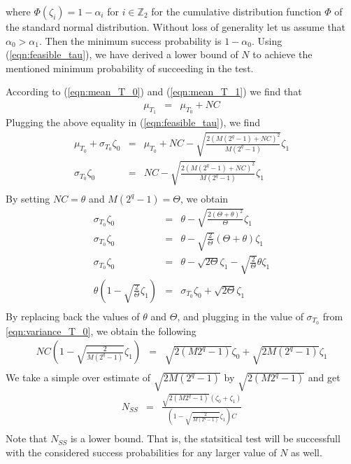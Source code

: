 where $\mathit{\Phi}(\zeta_i) = 1 - \alpha_i$ for $i \in \mathbb{Z}_2$ for the cumulative distribution function $\mathit{\Phi}$ of the standard normal distribution. Without loss of generality let us assume that $\alpha_0 > \alpha_1$. Then the minimum success probability is $1-\alpha_0$. Using (\ref{eqn:feasible_tau}), we have derived a lower bound of $N$ to achieve the mentioned minimum probability of succeeding in the test. \par \noindent According to (\ref{eqn:mean_T_0}) and (\ref{eqn:mean_T_1}) we find that 
\begin{eqnarray}
\mu_{T_1} &=& \mu_{T_0} + NC
\end{eqnarray}
Plugging the above equality in (\ref{eqn:feasible_tau}), we find
\begin{eqnarray*}
\mu_{T_0}+\sigma_{T_0}\zeta_0 &=& \mu_{T_0} + NC - \sqrt{\frac{2\left(M\left(2^q -1 \right) + NC\right)^2}{M\left(2^q -1 \right)}}\zeta_1\\
\sigma_{T_0}\zeta_0 &=& NC - \sqrt{\frac{2\left(M\left(2^q -1 \right) + NC\right)^2}{M\left(2^q -1 \right)}}\zeta_1\\
\end{eqnarray*}
By setting $NC = \theta$ and $M\left(2^q -1 \right) = \Theta$, we obtain
\begin{eqnarray*}
\sigma_{T_0}\zeta_0 &=& \theta - \sqrt{\frac{2\left(\Theta + \theta \right)^2}{\Theta}}\zeta_1\\
\sigma_{T_0}\zeta_0 &=& \theta - \sqrt{\frac{2}{\Theta}}\left(\Theta + \theta \right)\zeta_1\\
\sigma_{T_0}\zeta_0 &=& \theta - \sqrt{2\Theta} \zeta_1 - \sqrt{\frac{2}{\Theta}} \theta \zeta_1\\
\theta \left( 1 - \sqrt{\frac{2}{\Theta}} \zeta_1 \right) &=& \sigma_{T_0}\zeta_0 + \sqrt{2\Theta} \zeta_1\\
\end{eqnarray*}
By replacing back the values of $\theta$ and $\Theta$, and plugging in the value of $\sigma_{T_0}$ from \ref{eqn:variance_T_0}, we obtain the following
\begin{eqnarray*}
NC \left( 1 - \sqrt{\frac{2}{M\left(2^q -1 \right)}} \zeta_1 \right) &=& \sqrt{2(M2^{q} - 1)}\zeta_0 + \sqrt{2M\left(2^q -1 \right)} \zeta_1\\
\end{eqnarray*}
We take a simple over estimate of $\sqrt{2M\left(2^q -1 \right)}$ by $\sqrt{2(M2^{q} - 1)}$  and get
\begin{eqnarray*}
N_{SS} &=& \frac{\sqrt{2(M2^{q} - 1)} \left( \zeta_0 +  \zeta_1 \right)}{\left( 1 - \sqrt{\frac{2}{M\left(2^q -1 \right)}} \zeta_1 \right)C} \label{eqn:N_ss}\\
\end{eqnarray*}
Note that $N_{SS}$ is a lower bound. That is, the statsitical test will be successfull with the considered success probabilities for any larger value of $N$ as well.


